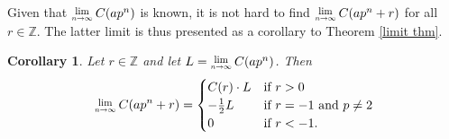 \documentclass[a0]{a0poster}
\newtheorem{corollary}{Corollary}
\theoremstyle{definition}
\newcommand{\Lim}[1]{\raisebox{0.5ex}{\scalebox{0.8}{$\displaystyle \lim_{#1}\;$}}}
\newcommand{\thref}[1]{Theorem \ref{#1}}
\newcommand{\coref}[1]{Corollary \ref{#1}}
\newcommand{\thlabel}[1]{\label{#1}}
\begin{document}
\begin{textblock}{7}
Given that $\Lim{n\rightarrow\infty}C(ap^n)$ is known, it is not hard to find $\Lim{n\rightarrow\infty}C(ap^n+r)$ for all $r\in\mathbb{Z}$. The latter limit is thus presented as a corollary to \thref{limit thm}.

\begin{corollary}\thlabel{limit cor}Let $r\in\mathbb{Z}$ and let $L=\Lim{n\rightarrow\infty}C(ap^n)$. Then
$$\Lim{n\rightarrow\infty}C(ap^n+r)=\begin{cases}
C(r)\cdot L & \mbox{if }r>0\\
-\frac{1}{2}L & \mbox{if } r=-1 \text{ and } p\neq 2\\
0 & \mbox{if } r<-1.
\end{cases}$$
\end{corollary}







\end{textblock}
\end{document}

